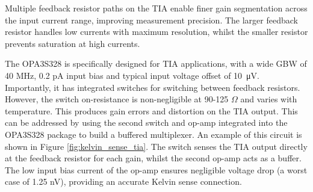 
Multiple feedback resistor paths on the \ac{TIA} enable finer gain segmentation across the input current range, improving measurement precision. The larger feedback resistor handles low currents with maximum resolution, whilst the smaller resistor prevents saturation at high currents. 

The OPA3S328 is specifically designed for \ac{TIA} applications, with a wide GBW of 40 MHz, 0.2 pA input bias and typical input voltage offset of \SI{10}{\micro\volt}. Importantly, it has integrated switches for switching between feedback resistors. However, the switch on-resistance is non-negligible at 90-125 $\Omega$ and varies with temperature. This produces gain errors and distortion on the \ac{TIA} output. This can be addressed by using the second switch and op-amp integrated into the OPA3S328 package to build a buffered multiplexer. An example of this circuit is shown in Figure \ref{fig:kelvin_sense_tia}. The switch senses the \ac{TIA} output directly at the feedback resistor for each gain, whilst the second op-amp acts as a buffer. The low input bias current of the op-amp ensures negligible voltage drop (a worst case of 1.25 nV), providing an accurate Kelvin sense connection.



